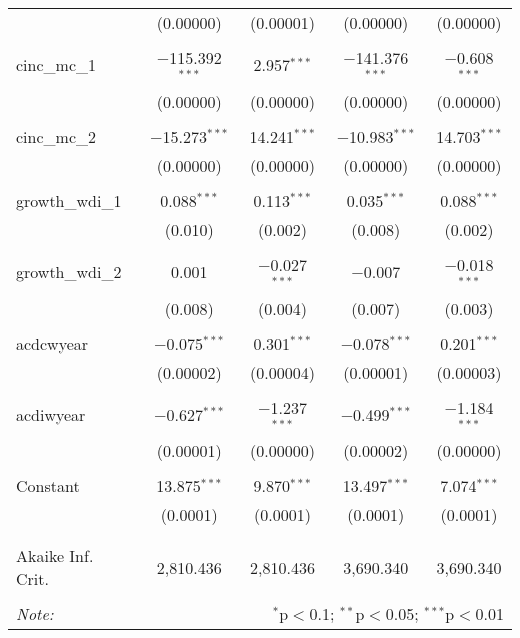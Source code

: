 \begin{table}[!htbp]
\begin{tabular}{@{\extracolsep{5pt}}lcccc}
  & (0.00000) & (0.00001) & (0.00000) & (0.00000) \\ 
  & & & & \\ 
 cinc\_mc\_1 & $-$115.392$^{***}$ & 2.957$^{***}$ & $-$141.376$^{***}$ & $-$0.608$^{***}$ \\ 
  & (0.00000) & (0.00000) & (0.00000) & (0.00000) \\ 
  & & & & \\ 
 cinc\_mc\_2 & $-$15.273$^{***}$ & 14.241$^{***}$ & $-$10.983$^{***}$ & 14.703$^{***}$ \\ 
  & (0.00000) & (0.00000) & (0.00000) & (0.00000) \\ 
  & & & & \\ 
 growth\_wdi\_1 & 0.088$^{***}$ & 0.113$^{***}$ & 0.035$^{***}$ & 0.088$^{***}$ \\ 
  & (0.010) & (0.002) & (0.008) & (0.002) \\ 
  & & & & \\ 
 growth\_wdi\_2 & 0.001 & $-$0.027$^{***}$ & $-$0.007 & $-$0.018$^{***}$ \\ 
  & (0.008) & (0.004) & (0.007) & (0.003) \\ 
  & & & & \\ 
 acdcwyear & $-$0.075$^{***}$ & 0.301$^{***}$ & $-$0.078$^{***}$ & 0.201$^{***}$ \\ 
  & (0.00002) & (0.00004) & (0.00001) & (0.00003) \\ 
  & & & & \\ 
 acdiwyear & $-$0.627$^{***}$ & $-$1.237$^{***}$ & $-$0.499$^{***}$ & $-$1.184$^{***}$ \\ 
  & (0.00001) & (0.00000) & (0.00002) & (0.00000) \\ 
  & & & & \\ 
 Constant & 13.875$^{***}$ & 9.870$^{***}$ & 13.497$^{***}$ & 7.074$^{***}$ \\ 
  & (0.0001) & (0.0001) & (0.0001) & (0.0001) \\ 
  & & & & \\ 
\hline \\[-1.8ex] 
Akaike Inf. Crit. & 2,810.436 & 2,810.436 & 3,690.340 & 3,690.340 \\ 
\hline 
\hline \\[-1.8ex] 
\textit{Note:}  & \multicolumn{4}{r}{$^{*}$p$<$0.1; $^{**}$p$<$0.05; $^{***}$p$<$0.01} \\ 
\end{tabular} 
\end{table} 
